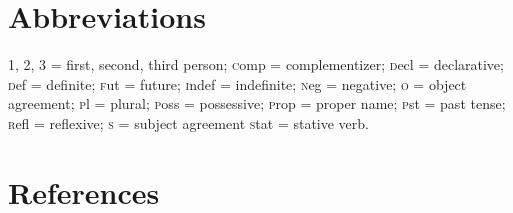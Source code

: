 \documentclass[output=paper]{LSP/langsci}
\begin{document}
\section*{Abbreviations}
1, 2, 3 = first, second, third person; {\textsc comp} = complementizer; {\textsc decl} = declarative; {\textsc def} = definite; {\textsc fut} = future; {\textsc indef} = indefinite; {\textsc neg} = negative; {\textsc o} = object agreement; {\textsc pl} = plural; {\textsc poss} = possessive; {\textsc prop} = proper name; {\textsc pst} = past tense; {\textsc refl} = reflexive; {\textsc s} = subject agreement {\textsc stat} = stative verb.

\section*{References}
 \printbibliography[heading=subbibliography,notkeyword=this]
\end{document}
